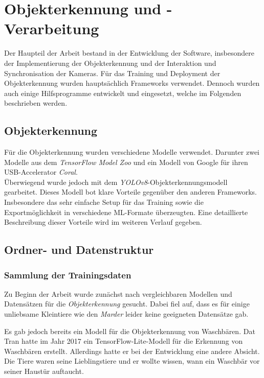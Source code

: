 


\section{Objekterkennung und -Verarbeitung}

Der Haupteil der Arbeit bestand in der Entwicklung der Software, insbesondere der Implementierung der Objekterkennung und der Interaktion und Synchronisation der Kameras. Für das Training und Deployment der Objekterkennung wurden hauptsächlich Frameworks verwendet. Dennoch wurden auch einige Hilfsprogramme entwickelt und eingesetzt, welche im Folgenden beschrieben werden.

\subsection{Objekterkennung}

Für die Objekterkennung wurden verschiedene Modelle verwendet. Darunter zwei Modelle aus dem \textit{TensorFlow Model Zoo} und ein Modell von Google für ihren USB-Accelerator \textit{Coral}.
\\
Überwiegend wurde jedoch mit dem \textit{YOLOv8}-Objekterkennungsmodell gearbeitet. Dieses Modell bot klare Vorteile gegenüber den anderen Frameworks. Insbesondere das sehr einfache Setup für das Training sowie die Exportmöglichkeit in verschiedene \ac{ML}-Formate überzeugten. Eine detaillierte Beschreibung dieser Vorteile wird im weiteren Verlauf gegeben.

\subsection{Ordner- und Datenstruktur}

\subsubsection{Sammlung der Trainingsdaten}

Zu Beginn der Arbeit wurde zunächst nach vergleichbaren Modellen und Datensätzen für die \textit{Objekterkennung} gesucht. Dabei fiel auf, dass es für einige unliebsame Kleintiere wie den \textit{Marder} leider keine geeigneten Datensätze gab.

Es gab jedoch bereits ein Modell für die Objekterkennung von Waschbären. Dat Tran hatte im Jahr 2017 ein TensorFlow-Lite-Modell für die Erkennung von Waschbären erstellt. Allerdings hatte er bei der Entwicklung eine andere Absicht. Die Tiere waren seine Lieblingstiere und er wollte wissen, wann ein Waschbär vor seiner Haustür auftaucht.
\cite{wasch_detect}

